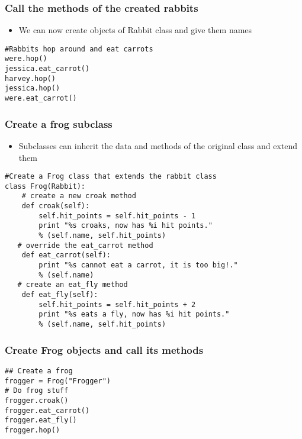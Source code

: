 \documentclass{beamer}
\newcommand\Fontix{\fontsize{9}{8.3}\selectfont}
\begin{document}
\begin{frame}[fragile]
\frametitle{Call the methods of the created rabbits}
\begin{itemize}
\item We can now create objects of Rabbit class and give them names
\end{itemize}
\begin{lstlisting}
#Rabbits hop around and eat carrots
were.hop()
jessica.eat_carrot()
harvey.hop()
jessica.hop()
were.eat_carrot()
\end{lstlisting}
\end{frame}

\begin{frame}[fragile]
\frametitle{Create a frog subclass}
\Fontix
\begin{itemize}
\item Subclasses can inherit the data and methods of the original class and extend them
\end{itemize}
\begin{lstlisting}
#Create a Frog class that extends the rabbit class
class Frog(Rabbit):
    # create a new croak method
    def croak(self):
        self.hit_points = self.hit_points - 1
        print "%s croaks, now has %i hit points." 
        % (self.name, self.hit_points)
   # override the eat_carrot method
    def eat_carrot(self):
        print "%s cannot eat a carrot, it is too big!." 
        % (self.name)
   # create an eat_fly method
    def eat_fly(self):
        self.hit_points = self.hit_points + 2
        print "%s eats a fly, now has %i hit points." 
        % (self.name, self.hit_points)
\end{lstlisting}
\end{frame}

\begin{frame}[fragile]
\frametitle{Create Frog objects and call its methods}
\begin{lstlisting}
## Create a frog
frogger = Frog("Frogger")
# Do frog stuff
frogger.croak()
frogger.eat_carrot()
frogger.eat_fly()
frogger.hop()
\end{lstlisting}
\end{frame}
\end{document}
